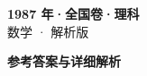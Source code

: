 \documentclass[zihao=-4, a4paper]{ctexart}
\begin{document}
\begin{center}
  {\Large\bfseries 1987 年·全国卷·理科}\\[4pt]
  {\large 数学 · 解析版}
\end{center}
\medskip
{}

\clearpage
{}
\begin{center}{\Large\bfseries 参考答案与详细解析}\end{center}
\medskip

\end{document}
